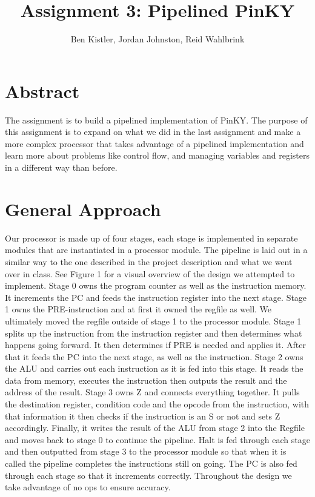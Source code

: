 \documentclass{article}
\begin{document}
\title{Assignment 3: Pipelined PinKY}

\author{Ben Kistler, Jordan Johnston, Reid Wahlbrink}


\maketitle
\thispagestyle{empty}

\begin{multicols}{2}
\section{Abstract}
The assignment is to build a pipelined implementation of PinKY. The purpose of this assignment is to expand on what we did in
the last assignment and make a more complex processor that takes advantage of a pipelined implementation and learn more
about problems like control flow, and managing variables and registers in a different way than before. 


\section{General Approach}
Our processor is made up of four stages, each stage is implemented in separate modules that are instantiated in a processor
module. The pipeline is laid out in a similar way to the one described in the project description and what we went over in class. See Figure 1 for a visual overview of the design we attempted to implement.
Stage 0 owns the program counter as well as the instruction memory. It increments the PC and feeds the instruction register
into the next stage. Stage 1 owns the PRE-instruction and at first it owned the regfile as well. We ultimately moved the regfile outside of stage 1 to the processor module. Stage 1 splits up the instruction from the
instruction register and then determines what happens going forward. It then determines if PRE is needed and applies it. After
that it feeds the PC into the next stage, as well as the instruction. Stage 2 owns the ALU and carries out each instruction as it is
fed into this stage. It reads the data from memory, executes the instruction then outputs the result and the address of the result.
Stage 3 owns Z and connects everything together. It pulls the destination register, condition code and the opcode from the
instruction, with that information it then checks if the instruction is an S or not and sets Z accordingly. Finally, it writes the result
of the ALU from stage 2 into the Regfile and moves back to stage 0 to continue the pipeline. Halt is fed through each stage and
then outputted from stage 3 to the processor module so that when it is called the pipeline completes the instructions still on
going. The PC is also fed through each stage so that it increments correctly. Throughout the design we take advantage of no
ops to ensure accuracy. 
  

\end{multicols}
\end{document}

